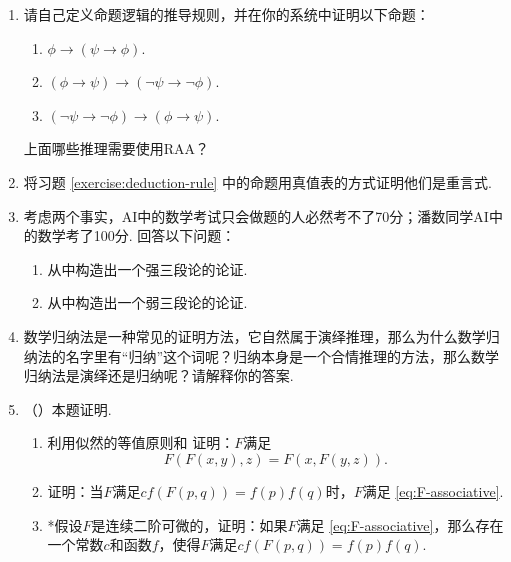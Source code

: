 \begin{enumerate}[wide, labelindent=0pt]
    \item \label{exercise:deduction-rule} 请自己定义命题逻辑的推导规则，并在你的系统中证明以下命题：
    \begin{enumerate}
        \item $\phi\to(\psi\to\phi)$.
        \item $(\phi\to\psi)\to(\neg\psi\to\neg\phi)$.
        \item $(\neg\psi\to\neg\phi)\to(\phi\to\psi)$.
    \end{enumerate}
    上面哪些推理需要使用RAA？

    \item 将习题 \ref{exercise:deduction-rule} 中的命题用真值表的方式证明他们是重言式.
    
    \item 考虑两个事实，AI中的数学考试只会做题的人必然考不了70分；潘数同学AI中的数学考了100分. 回答以下问题：
    \begin{enumerate}
        \item 从中构造出一个强三段论的论证.
        \item 从中构造出一个弱三段论的论证. 
    \end{enumerate}

    \item 数学归纳法是一种常见的证明方法，它自然属于演绎推理，那么为什么数学归纳法的名字里有“归纳”这个词呢？归纳本身是一个合情推理的方法，那么数学归纳法是演绎还是归纳呢？请解释你的答案.
    
    \item \label{exercise:derive-F} （\cite{coxProbabilityFrequencyReasonable1946}）本题证明. 
    \begin{enumerate}
        \item 利用似然的等值原则和 证明：$F$满足
        \begin{equation}
            F(F(x,y),z)=F(x,F(y,z)). \label{eq:F-associative}
        \end{equation}
        \item 证明：当$F$满足$cf(F(p,q))=f(p)f(q)$时，$F$满足 \eqref{eq:F-associative}.
        \item *假设$F$是连续二阶可微的，证明：如果$F$满足 \eqref{eq:F-associative}，那么存在一个常数$c$和函数$f$，使得$F$满足$cf(F(p,q))=f(p)f(q)$.
    \end{enumerate}
    

\end{enumerate}
